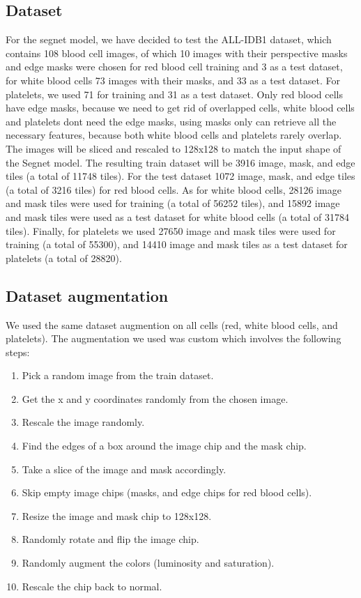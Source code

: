 \subsection{Dataset}
\hspace{\parindent}
For the segnet model, we have decided to test the ALL-IDB1 dataset, which contains 108 blood cell images, of which 10 images with their perspective masks and edge masks were chosen for red blood cell training and 3 as a test dataset, for white blood cells 73 images with their masks, and 33 as a test dataset.
For platelets, we used 71 for training and 31 as a test dataset.
Only red blood cells have edge masks, because we need to get rid of overlapped cells, white blood cells and platelets dont need the edge masks, using masks only can retrieve all the necessary features, because both white blood cells and platelets rarely overlap.
The images will be sliced and rescaled to 128x128 to match the input shape of the Segnet model.
The resulting train dataset will be 3916 image, mask, and edge tiles (a total of 11748 tiles).
For the test dataset 1072 image, mask, and edge tiles (a total of 3216 tiles) for red blood cells.
As for white blood cells, 28126 image and mask tiles were used for training (a total of 56252 tiles), and 15892 image and mask tiles were used as a test dataset for white blood cells (a total of 31784 tiles).
Finally, for platelets we used 27650 image and mask tiles were used for training (a total of 55300), and 14410 image and mask tiles as a test dataset for platelets (a total of 28820).

\vspace{0.1in}



\subsection{Dataset augmentation}
\hspace{\parindent}
We used the same dataset augmention on all cells (red, white blood cells, and platelets).
The augmentation we used was custom which involves the following steps:
\begin{enumerate}
    \item Pick a random image from the train dataset.
    \item Get the x and y coordinates randomly from the chosen image.
    \item Rescale the image randomly.
    \item Find the edges of a box around the image chip and the mask chip.
    \item Take a slice of the image and mask accordingly.
    \item Skip empty image chips (masks, and edge chips for red blood cells).
    \item Resize the image and mask chip to 128x128.
    \item Randomly rotate and flip the image chip.
    \item Randomly augment the colors (luminosity and saturation).
    \item Rescale the chip back to normal.
\end{enumerate}

